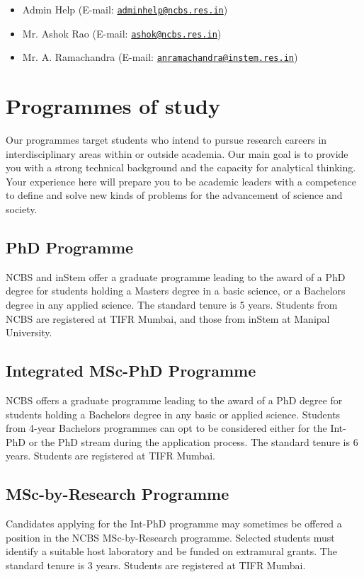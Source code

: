 \documentclass[a4paper,10pt]{article}
\newcommand\MAILTO[2]{#1 (E-mail: \href{mailto:#2}{\nolinkurl{#2}})}
\begin{document}
\begin{itemize}
    \item \MAILTO{Admin Help}{adminhelp@ncbs.res.in}
    \item \MAILTO{Mr. Ashok Rao}{ashok@ncbs.res.in}
    \item \MAILTO{Mr. A. Ramachandra}{anramachandra@instem.res.in}
\end{itemize}

\newpage
\tableofcontents

\newpage
\section{Programmes of study}

Our programmes target students who intend to pursue research careers in interdisciplinary
areas within or outside academia. Our main goal is to provide you with a strong technical
background and the capacity for analytical thinking. Your experience here will prepare you
to be academic leaders with a competence to define and solve new kinds of problems for the
advancement of science and society.

\subsection{PhD Programme}
NCBS and inStem offer a graduate programme leading to the award of a
PhD degree for students holding a Masters degree in a basic science, or a Bachelors degree
in any applied science. The standard tenure is 5 years. Students from NCBS are registered at
TIFR Mumbai, and those from inStem at Manipal University.

\subsection{Integrated MSc-PhD Programme}
NCBS offers a graduate programme leading to the
award of a PhD degree for students holding a Bachelors degree in any basic or applied
science. Students from 4-year Bachelors programmes can opt to be considered either for the
Int-PhD or the PhD stream during the application process. The standard tenure is 6 years.
Students are registered at TIFR Mumbai.

\subsection{MSc-by-Research Programme}
Candidates applying for the Int-PhD programme may
sometimes be offered a position in the NCBS MSc-by-Research programme. Selected
students must identify a suitable host laboratory and be funded on extramural grants. The
standard tenure is 3 years. Students are registered at TIFR Mumbai.
\end{document}
